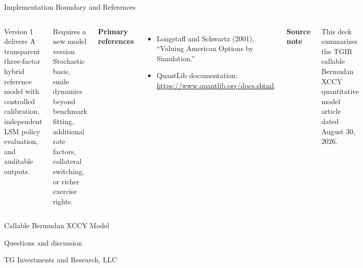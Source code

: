 \documentclass[aspectratio=169]{beamer}
\begin{document}
\begin{frame}{Implementation Boundary and References}
  \begin{columns}[T,onlytextwidth]
      \begin{block}{Version 1 delivers}
        A transparent three-factor hybrid reference model with controlled
        calibration, independent LSM policy evaluation, and auditable outputs.
      \end{block}
      \begin{block}{Requires a new model version}
        Stochastic basis, smile dynamics beyond benchmark fitting, additional
        rate factors, collateral switching, or richer exercise rights.
      \end{block}
      \textbf{Primary references}
      \begin{itemize}
        \item Longstaff and Schwartz (2001), ``Valuing American Options by Simulation.''
        \item QuantLib documentation: \url{https://www.quantlib.org/docs.shtml}.
      \end{itemize}
      \vspace{0.5em}
      \textbf{Source note}

      This deck summarizes the TGIR callable Bermudan XCCY quantitative model
      article dated August 30, 2026.
  \end{columns}
\end{frame}

\begin{frame}[plain]
  \begin{center}
    \vfill
    {\color{tgirnavy}Callable Bermudan XCCY Model\par}
    \vspace{0.75em}
    {\large Questions and discussion\par}
    \vspace{1.5em}
    {\small TG Investments and Research, LLC\par}
    \vfill
  \end{center}
\end{frame}
\end{document}
